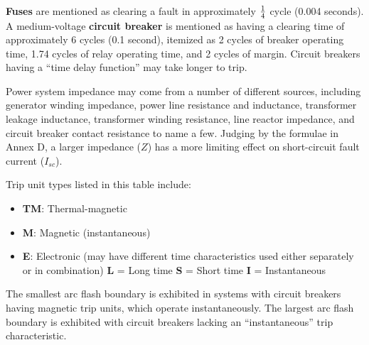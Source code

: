 





 






{\bf Fuses} are mentioned as clearing a fault in approximately $1 \over 4$ cycle (0.004 seconds).  A medium-voltage {\bf circuit breaker} is mentioned as having a clearing time of approximately 6 cycles (0.1 second), itemized as 2 cycles of breaker operating time, 1.74 cycles of relay operating time, and 2 cycles of margin.  Circuit breakers having a ``time delay function'' may take longer to trip.

\vskip 10pt

Power system impedance may come from a number of different sources, including generator winding impedance, power line resistance and inductance, transformer leakage inductance, transformer winding resistance, line reactor impedance, and circuit breaker contact resistance to name a few.  Judging by the formulae in Annex D, a larger impedance ($Z$) has a more limiting effect on short-circuit fault current ($I_{sc}$).

\vskip 10pt

Trip unit types listed in this table include:

\begin{itemize}
\item{} {\bf TM}: Thermal-magnetic
\item{} {\bf M}: Magnetic (instantaneous)
\item{} {\bf E}: Electronic (may have different time characteristics used either separately or in combination)
\itemitem{} {\bf L} = Long time 
\itemitem{} {\bf S} = Short time 
\itemitem{} {\bf I} = Instantaneous
\end{itemize}

The smallest arc flash boundary is exhibited in systems with circuit breakers having magnetic trip units, which operate instantaneously.  The largest arc flash boundary is exhibited with circuit breakers lacking an ``instantaneous'' trip characteristic.




